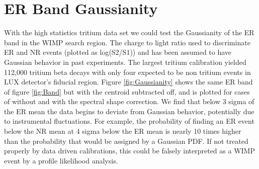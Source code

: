 \section{ER Band Gaussianity}
With the high statistics tritium data set we could test the Gaussianity of the ER band in the WIMP search region. The charge to light ratio used to discriminate ER and NR events (plotted as log(S2/S1)) and has been assumed to have Gaussian behavior in past experiments. The largest tritium calibration yielded 112,000 tritium beta decays with only four expected to be non tritium events \cite{LUX_BG} in LUX detector's fiducial region. Figure \ref{fig:Gaussianity} shows the same ER band of figure \ref{fig:Band} but with the centroid subtracted off, and is plotted for cases of without and with the spectral shape correction. We find that below 3 sigma of the ER mean the data begins to deviate from Gaussian behavior, potentially due to instrumental fluctuations. For example, the probability of finding an ER event below the NR mean at 4 sigma below the ER mean is nearly 10 times higher than the probability that would be assigned by a Gaussian PDF. If not treated properly by data driven calibrations, this could be falsely interpreted as a WIMP event by a profile likelihood analysis.

